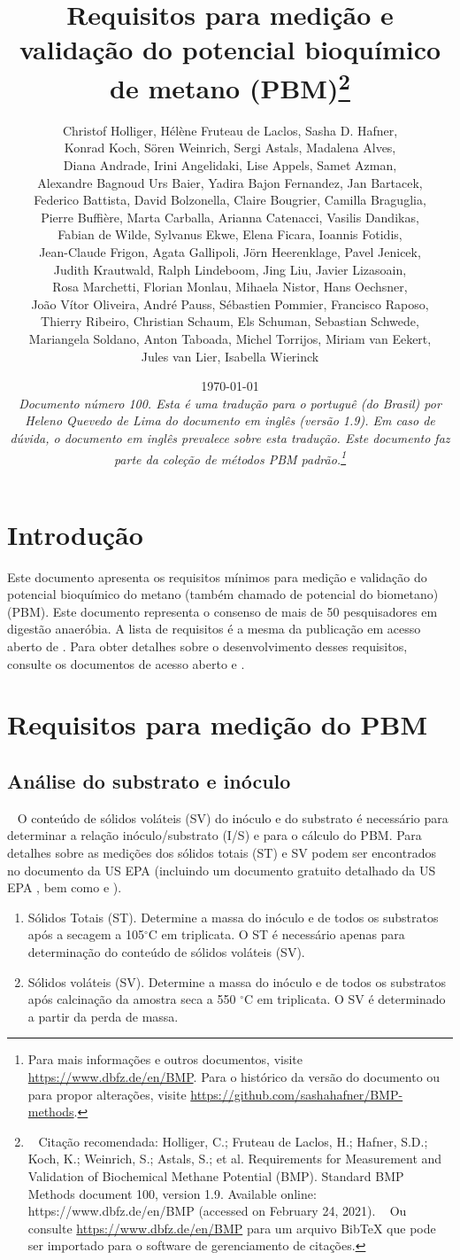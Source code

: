 \documentclass[]{article}
\title {Requisitos para medição e validação do potencial bioquímico de metano (PBM)\footnote{
  Citação recomendada: 
Holliger, C.; Fruteau de Laclos, H.; Hafner, S.D.; Koch, K.; Weinrich, S.; Astals, S.; et al. Requirements for Measurement and Validation of Biochemical Methane Potential (BMP). Standard BMP Methods document 100, version 1.9. Available online: https://www.dbfz.de/en/BMP (accessed on February 24, 2021).
\newline
  Ou consulte \url{https://www.dbfz.de/en/BMP} para um arquivo BibTeX que pode ser importado para o software de gerenciamento de citações.
}}
\author{
Christof Holliger, 
H{\'e}l{\`e}ne Fruteau de Laclos,
Sasha D. Hafner,\\
Konrad Koch,
S{\"o}ren Weinrich,
Sergi Astals, 
Madalena Alves, \\ 
Diana Andrade,
Irini Angelidaki,
Lise Appels, 
Samet Azman, \\
Alexandre Bagnoud
Urs Baier,
Yadira Bajon Fernandez,
Jan Bartacek,\\
Federico Battista,
David Bolzonella,
Claire Bougrier,
Camilla Braguglia, \\
Pierre Buffi{\`e}re,
Marta Carballa,
Arianna Catenacci,
Vasilis Dandikas, \\
Fabian de Wilde,
Sylvanus Ekwe,
Elena Ficara,
Ioannis Fotidis,\\
Jean-Claude Frigon,
Agata Gallipoli,
J{\"o}rn Heerenklage,
Pavel Jenicek,\\
Judith Krautwald,
Ralph Lindeboom,
Jing Liu,
Javier Lizasoain, \\
Rosa Marchetti,
Florian Monlau,
Mihaela Nistor,
Hans Oechsner,\\
Jo{\~a}o V{\'i}tor Oliveira,
Andr{\'e} Pauss,
S{\'e}bastien Pommier,
Francisco Raposo, \\
Thierry Ribeiro,
Christian Schaum,
Els Schuman,
Sebastian Schwede, \\
Mariangela Soldano,
Anton Taboada,
Michel Torrijos,
Miriam van Eekert,\\
Jules van Lier, 
Isabella Wierinck
}
\date{\today \\
\bigskip
\textit{
  Documento número 100.
  Esta é uma tradução para o portuguê (do Brasil) por Heleno Quevedo de Lima do documento em inglês (versão 1.9). Em caso de dúvida, o documento em inglês prevalece sobre esta tradução.
  Este documento faz parte da coleção de métodos PBM padrão.\footnote{
    Para mais informações e outros documentos, visite \url{https://www.dbfz.de/en/BMP}. 
    Para o histórico da versão do documento ou para propor alterações, visite \url{https://github.com/sashahafner/BMP-methods}.
  }
}
}
\begin{document}
\maketitle

\section{Introdução}
Este documento apresenta os requisitos mínimos para medição e validação do potencial bioquímico do metano (também chamado de potencial do biometano) (PBM). 
Este documento representa o consenso de mais de 50 pesquisadores em digestão anaeróbia. 
A lista de requisitos é a mesma da publicação em acesso aberto de \citet{holligerStandardizationBiomethanePotential2021}. 
Para obter detalhes sobre o desenvolvimento desses requisitos, consulte os documentos de acesso aberto \citet{holligerStandardizationBiomethanePotential2016} e \citet{hafnerImprovingInterlaboratoryReproducibility2020}.

\section{Requisitos para medição do PBM}
\label{sec:requirements}
\subsection{Análise do substrato e inóculo}
\label{sec:analysis}
  O conteúdo de sólidos voláteis (SV) do inóculo e do substrato é necessário para determinar a relação inóculo/substrato (I/S) e para o cálculo do PBM. Para detalhes sobre as medições dos sólidos totais (ST) e SV podem ser encontrados no documento da US EPA (incluindo um documento gratuito detalhado da US EPA \citep{epaMethod1684Total2001}, bem como \citet{strachDeterminationTotalSolids2020} e \citet{bairdStandardMethodsExamination2017}). 
 
\begin{enumerate}
    \item Sólidos Totais (ST). Determine a massa do inóculo e de todos os substratos após a secagem a 105$^\circ$C em triplicata. O ST é necessário apenas para determinação do conteúdo de sólidos voláteis (SV).
    \item Sólidos voláteis (SV). Determine a massa do inóculo e de todos os substratos após calcinação da amostra seca a 550 $^\circ$C em triplicata. O SV é determinado a partir da perda de massa.
\end{enumerate}
\end{document}
